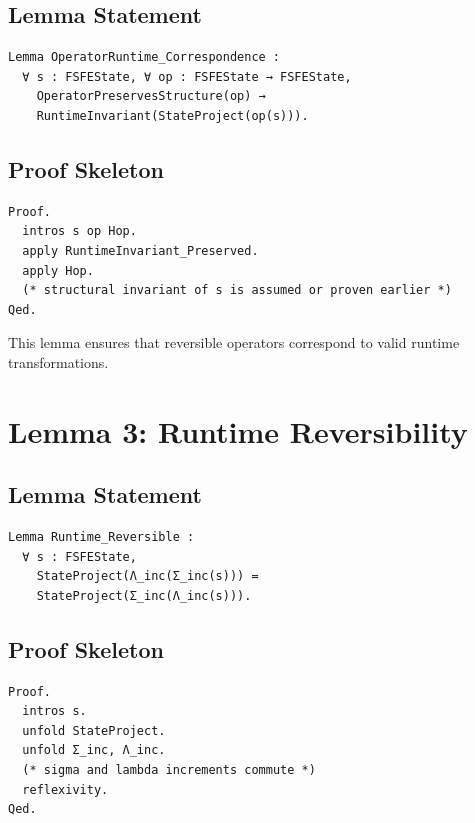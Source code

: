 \documentclass[11pt]{article}
\begin{document}
\subsection{Lemma Statement}

\begin{verbatim}
Lemma OperatorRuntime_Correspondence :
  ∀ s : FSFEState, ∀ op : FSFEState → FSFEState,
    OperatorPreservesStructure(op) →
    RuntimeInvariant(StateProject(op(s))).
\end{verbatim}

\subsection{Proof Skeleton}

\begin{verbatim}
Proof.
  intros s op Hop.
  apply RuntimeInvariant_Preserved.
  apply Hop.
  (* structural invariant of s is assumed or proven earlier *)
Qed.
\end{verbatim}

This lemma ensures that reversible operators correspond to valid runtime
transformations.

\newpage


\section{Lemma 3: Runtime Reversibility}

\subsection{Lemma Statement}

\begin{verbatim}
Lemma Runtime_Reversible :
  ∀ s : FSFEState,
    StateProject(Λ_inc(Σ_inc(s))) =
    StateProject(Σ_inc(Λ_inc(s))).
\end{verbatim}

\subsection{Proof Skeleton}

\begin{verbatim}
Proof.
  intros s.
  unfold StateProject.
  unfold Σ_inc, Λ_inc.
  (* sigma and lambda increments commute *)
  reflexivity.
Qed.
\end{verbatim}
\end{document}
